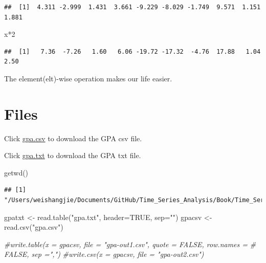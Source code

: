 \documentclass[
]{book}
\newenvironment{Shaded}{\begin{snugshade}}{\end{snugshade}}
\newcommand{\AttributeTok}[1]{\textcolor[rgb]{0.77,0.63,0.00}{#1}}
\newcommand{\CommentTok}[1]{\textcolor[rgb]{0.56,0.35,0.01}{\textit{#1}}}
\newcommand{\ConstantTok}[1]{\textcolor[rgb]{0.00,0.00,0.00}{#1}}
\newcommand{\DecValTok}[1]{\textcolor[rgb]{0.00,0.00,0.81}{#1}}
\newcommand{\FunctionTok}[1]{\textcolor[rgb]{0.00,0.00,0.00}{#1}}
\newcommand{\NormalTok}[1]{#1}
\newcommand{\OtherTok}[1]{\textcolor[rgb]{0.56,0.35,0.01}{#1}}
\newcommand{\SpecialCharTok}[1]{\textcolor[rgb]{0.00,0.00,0.00}{#1}}
\newcommand{\StringTok}[1]{\textcolor[rgb]{0.31,0.60,0.02}{#1}}
\theoremstyle{definition}
\theoremstyle{definition}
\theoremstyle{definition}
\theoremstyle{definition}
\theoremstyle{remark}
\begin{document}
\begin{verbatim}
##  [1]  4.311 -2.999  1.431  3.661 -9.229 -8.029 -1.749  9.571  1.151  1.881
\end{verbatim}

\begin{Shaded}
\begin{Highlighting}[]
\NormalTok{x}\SpecialCharTok{*}\DecValTok{2}
\end{Highlighting}
\end{Shaded}

\begin{verbatim}
##  [1]   7.36  -7.26   1.60   6.06 -19.72 -17.32  -4.76  17.88   1.04   2.50
\end{verbatim}

The element(elt)-wise operation makes our life easier.

\hypertarget{files}{%
\section{Files}\label{files}}

Click \href{http://www.chrisbilder.com/stat878/sections/1/gpa.csv}{gpa.csv} to download the GPA csv file.

Click \href{http://www.chrisbilder.com/stat878/sections/1/gpa.txt}{gpa.txt} to download the GPA txt file.

\begin{Shaded}
\begin{Highlighting}[]
\FunctionTok{getwd}\NormalTok{()}
\end{Highlighting}
\end{Shaded}

\begin{verbatim}
## [1] "/Users/weishangjie/Documents/GitHub/Time_Series_Analysis/Book/Time_Series_Analysis"
\end{verbatim}

\begin{Shaded}
\begin{Highlighting}[]
\NormalTok{gpatxt }\OtherTok{\textless{}{-}} \FunctionTok{read.table}\NormalTok{(}\StringTok{"gpa.txt"}\NormalTok{, }\AttributeTok{header=}\ConstantTok{TRUE}\NormalTok{, }\AttributeTok{sep=}\StringTok{""}\NormalTok{)}
\NormalTok{gpacsv }\OtherTok{\textless{}{-}} \FunctionTok{read.csv}\NormalTok{(}\StringTok{"gpa.csv"}\NormalTok{)}

\CommentTok{\#write.table(x = gpacsv, file = "gpa{-}out1.csv", quote = FALSE, row.names =}
\CommentTok{\#  FALSE, sep  =",")}
\CommentTok{\#write.csv(x = gpacsv, file = "gpa{-}out2.csv")}
\end{Highlighting}
\end{Shaded}
\end{document}
